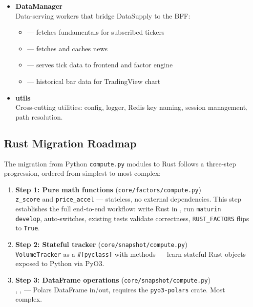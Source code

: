 \documentclass[a4paper, 11pt]{article}
\begin{document}
{\begin{itemize}[leftmargin=*,labelsep=6pt]
    \item \textbf{DataManager} \\
    Data-serving workers that bridge DataSupply to the BFF:
    \begin{itemize}
        \item \texttt{} --- fetches fundamentals for subscribed tickers
        \item \texttt{} --- fetches and caches news
        \item \texttt{} --- serves tick data to frontend and factor engine
        \item \texttt{} --- historical bar data for TradingView chart
    \end{itemize}

    \item \textbf{utils} \\
    Cross-cutting utilities: config, logger, Redis key naming, session management, path resolution.
\end{itemize}
\par}

\pagebreak

\subsection{Rust Migration Roadmap}
\label{sec:rust-roadmap}
The migration from Python \texttt{compute.py} modules to Rust follows a three-step progression, ordered from simplest to most complex:

\begin{enumerate}
    \item \textbf{Step 1: Pure math functions} (\texttt{core/factors/compute.py}) \\
    \texttt{z\_score} and \texttt{price\_accel} --- stateless, no external dependencies.
    This step establishes the full end-to-end workflow: write Rust in \texttt{},
    run \texttt{maturin develop}, \texttt{} auto-switches,
    existing tests validate correctness, \texttt{RUST\_FACTORS} flips to \texttt{True}.

    \item \textbf{Step 2: Stateful tracker} (\texttt{core/snapshot/compute.py}) \\
    \texttt{VolumeTracker} as a \texttt{\#[pyclass]} with methods ---
    learn stateful Rust objects exposed to Python via PyO3.

    \item \textbf{Step 3: DataFrame operations} (\texttt{core/snapshot/compute.py}) \\
    \texttt{}, \texttt{}, \texttt{}
    --- Polars DataFrame in/out, requires the \texttt{pyo3-polars} crate. Most complex.
\end{enumerate}
\end{document}
